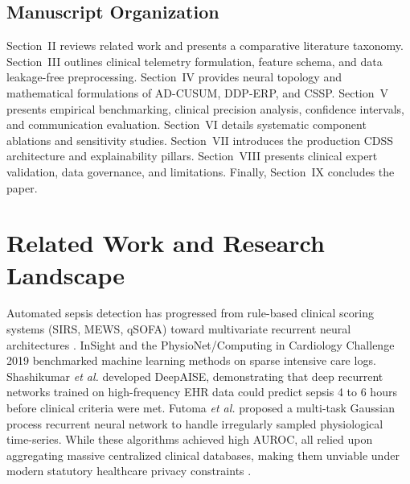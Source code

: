 \documentclass[journal,twocolumn,10pt]{IEEEtran}
\begin{document}
\subsection{Manuscript Organization}
Section~II reviews related work and presents a comparative literature taxonomy. Section~III outlines clinical telemetry formulation, feature schema, and data leakage-free preprocessing. Section~IV provides neural topology and mathematical formulations of AD-CUSUM, DDP-ERP, and CSSP. Section~V presents empirical benchmarking, clinical precision analysis, confidence intervals, and communication evaluation. Section~VI details systematic component ablations and sensitivity studies. Section~VII introduces the production CDSS architecture and explainability pillars. Section~VIII presents clinical expert validation, data governance, and limitations. Finally, Section~IX concludes the paper.

\section{Related Work and Research Landscape}
Automated sepsis detection has progressed from rule-based clinical scoring systems (SIRS, MEWS, qSOFA) toward multivariate recurrent neural architectures \cite{singer2016sepsis3,desautels2016prediction}. InSight \cite{desautels2016prediction} and the PhysioNet/Computing in Cardiology Challenge 2019 \cite{reyna2020physionet} benchmarked machine learning methods on sparse intensive care logs. Shashikumar \textit{et al.} \cite{shashikumar2021deepai} developed DeepAISE, demonstrating that deep recurrent networks trained on high-frequency EHR data could predict sepsis 4 to 6 hours before clinical criteria were met. Futoma \textit{et al.} \cite{futoma2017learning} proposed a multi-task Gaussian process recurrent neural network to handle irregularly sampled physiological time-series. While these algorithms achieved high AUROC, all relied upon aggregating massive centralized clinical databases, making them unviable under modern statutory healthcare privacy constraints \cite{kaissis2020trustworthy}.
\end{document}
